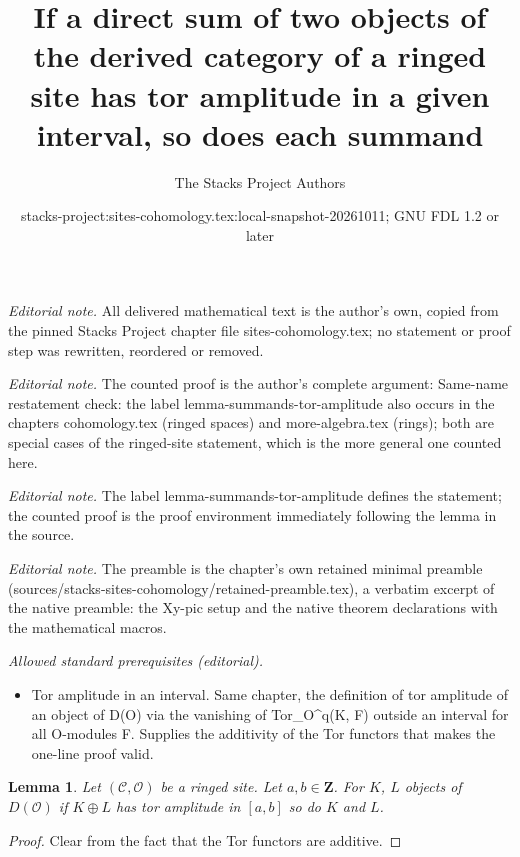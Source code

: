 \documentclass[10pt,a4paper]{amsart}
\title{If a direct sum of two objects of the derived category of a ringed site has tor amplitude in a given interval, so does each summand}
\author{The Stacks Project Authors}
\date{stacks-project:sites-cohomology.tex:local-snapshot-20261011; GNU FDL 1.2 or later}
\theoremstyle{plain}
\newtheorem{lemma}[subsection]{Lemma}
\theoremstyle{definition}
\theoremstyle{remark}
\numberwithin{equation}{subsection}
\begin{document}
\maketitle
\noindent\textit{Editorial note.} All delivered mathematical text is the author's own, copied from the pinned Stacks Project chapter file sites-cohomology.tex; no statement or proof step was rewritten, reordered or removed.\par\medskip
\noindent\textit{Editorial note.} The counted proof is the author's complete argument: Same-name restatement check: the label lemma-summands-tor-amplitude also occurs in the chapters cohomology.tex (ringed spaces) and more-algebra.tex (rings); both are special cases of the ringed-site statement, which is the more general one counted here.\par\medskip
\noindent\textit{Editorial note.} The label lemma-summands-tor-amplitude defines the statement; the counted proof is the proof environment immediately following the lemma in the source.\par\medskip
\noindent\textit{Editorial note.} The preamble is the chapter's own retained minimal preamble (sources/stacks-sites-cohomology/retained-preamble.tex), a verbatim excerpt of the native preamble: the Xy-pic setup and the native theorem declarations with the mathematical macros.\par\medskip
\noindent\textit{Allowed standard prerequisites (editorial).}\begin{itemize}
\item Tor amplitude in an interval. Same chapter, the definition of tor amplitude of an object of D(O) via the vanishing of Tor\_O\textasciicircum{}q(K, F) outside an interval for all O-modules F. Supplies the additivity of the Tor functors that makes the one-line proof valid.
\end{itemize}\medskip
\begin{lemma}
\label{lemma-summands-tor-amplitude}
Let $(\mathcal{C}, \mathcal{O})$ be a ringed site. Let $a, b \in \mathbf{Z}$.
For $K$, $L$ objects of $D(\mathcal{O})$ if $K \oplus L$ has tor
amplitude in $[a, b]$ so do $K$ and $L$.
\end{lemma}

\begin{proof}
Clear from the fact that the Tor functors are additive.
\end{proof}
\end{document}
